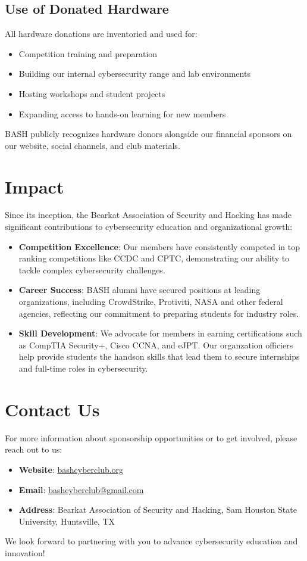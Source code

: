 \documentclass[11pt,letterpaper]{article}
\begin{document}
\subsection*{Use of Donated Hardware}
All hardware donations are inventoried and used for:
\begin{itemize}
    \item Competition training and preparation
    \item Building our internal cybersecurity range and lab environments
    \item Hosting workshops and student projects
    \item Expanding access to hands-on learning for new members
\end{itemize}

BASH publicly recognizes hardware donors alongside our financial sponsors on our website, social channels, and club materials.


\section*{Impact}
Since its inception, the Bearkat Association of Security and Hacking has made significant contributions to cybersecurity education and organizational growth:

\begin{itemize}
    \item \textbf{Competition Excellence}: Our members have consistently competed in top ranking competitions like C\-C\-D\-C and C\-P\-T\-C\@, demonstrating our ability to tackle complex cybersecurity challenges.
    \item \textbf{Career Success}: BASH alumni have secured positions at leading organizations, including CrowdStrike, Protiviti, NASA and other federal agencies, reflecting our commitment to preparing students for industry roles.
    \item \textbf{Skill Development}: We advocate for members in earning certifications such as CompTIA Security+, Cisco C\-C\-N\-A, and eJPT\@. Our organzation officiers help provide students the handson skills that lead them to secure internships and full-time roles in cybersecurity.
\end{itemize}

\section*{Contact Us}
For more information about sponsorship opportunities or to get involved, please reach out to us:

\begin{itemize}
    \item \textbf{Website}: \url{bashcyberclub.org}
    \item \textbf{Email}: \href{mailto:bashcyberclub@gmail.com}{bashcyberclub@gmail.com}
    \item \textbf{Address}: Bearkat Association of Security and Hacking, Sam Houston State University, Huntsville, TX
\end{itemize}

We look forward to partnering with you to advance cybersecurity education and innovation!
\end{document}
